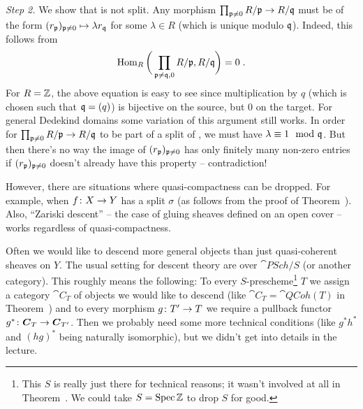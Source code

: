 \documentclass[a4paper,parskip=half,numbers=enddot, DIV=12]{scrreprt}
\begin{document}
\begin{rem}
	\emph{Step 2.} We show that  is not split. Any morphism $\prod_{\pp\neq 0}R/\pp\morphism R/\qq$ must be of the form $(r_{\mathfrak{p}})_{\mathfrak{p}\neq 0}\mapsto \lambda r_{\mathfrak{q}}$ for some $\lambda\in R$ (which is unique modulo $\mathfrak{q}$). Indeed, this follows from
	\begin{align*}
		\operatorname{Hom}_R\bigg(\prod_{\mathfrak{p}\neq\mathfrak{q},0}R/\mathfrak{p},R/\mathfrak{q}\bigg)=0\;.
	\end{align*}
	For $R=\mathbb{Z}$, the above equation is easy to see since multiplication by $q$ (which is chosen such that $\mathfrak{q}=(q)$) is bijective on the source, but $0$ on the target. For general Dedekind domains some variation of this argument still works. In order for $\prod_{\pp\neq 0}R/\pp\morphism R/\qq$ to be part of a split of , we must have 
	$\lambda\equiv1\mod {\mathfrak{q}}$. But then there's no way the image of $(r_{\mathfrak{p}})_{\mathfrak{p}\neq 0}$ has only finitely many non-zero entries if $(r_{\mathfrak{p}})_{\mathfrak{p}\neq 0}$ doesn't already have this property -- contradiction!
\end{rem}
\begin{rem}
	However, there are situations where quasi-compactness can be dropped. For example, when $f\colon X\morphism Y$ has a split $\sigma$ (as follows from the proof of Theorem~). Also, ``Zariski descent'' -- the case of gluing sheaves defined on an open cover -- works regardless of quasi-compactness.%
\end{rem}
Often we would like to descend more general objects than just quasi-coherent sheaves on $Y$. The usual setting for descent theory are  over $\cat{PSch}/S$ (or another category). This roughly means the following: To every $S$-prescheme\footnote{This $S$ is really just there for technical reasons; it wasn't involved at all in Theorem~. We could take $S=\operatorname{Spec} \mathbb{Z}$ to drop $S$ for good.} $T$ we assign a category $\cat C_T$ of objects we would like to descend (like $\cat C_T=\cat{QCoh}(T)$ in Theorem~) and to every morphism $g\colon T'\morphism T$ we require a pullback functor $g^*\colon \cat{C}_T\morphism\cat C_{T'}$. Then we probably need some more technical conditions (like $g^*h^*$ and $(hg)^*$ being naturally isomorphic), but we didn't get into details in the lecture.
\end{document}
